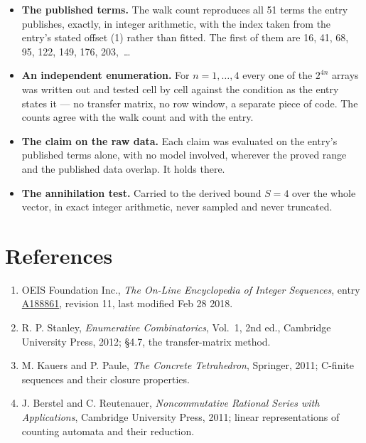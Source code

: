 \documentclass[11pt]{article}
\theoremstyle{definition}
\begin{document}
\begin{itemize}

\item {\bfseries The published terms.} The walk count reproduces all 51 terms the entry publishes, exactly, in integer arithmetic, with the index taken from the entry's stated offset (1) rather than fitted. The first of them are 16, 41, 68, 95, 122, 149, 176, 203,~\dots

\item {\bfseries An independent enumeration.} For $n = 1,\dots,4$ every one of the $2^{4n}$ arrays was written out and tested cell by cell against the condition as the entry states it --- no transfer matrix, no row window, a separate piece of code. The counts agree with the walk count and with the entry.

\item {\bfseries The claim on the raw data.} Each claim was evaluated on the entry's published terms alone, with no model involved, wherever the proved range and the published data overlap. It holds there.

\item {\bfseries The annihilation test.} Carried to the derived bound $S = 4$ over the whole vector, in exact integer arithmetic, never sampled and never truncated.

\end{itemize}

\section{References}

\begin{enumerate}

\item OEIS Foundation Inc., \emph{The On-Line Encyclopedia of Integer Sequences}, entry \href{https://oeis.org/A188861}{A188861}, revision 11, last modified Feb 28 2018.

\item R. P. Stanley, \emph{Enumerative Combinatorics}, Vol.~1, 2nd ed., Cambridge University Press, 2012; \S4.7, the transfer-matrix method.

\item M. Kauers and P. Paule, \emph{The Concrete Tetrahedron}, Springer, 2011; C-finite sequences and their closure properties.

\item J. Berstel and C. Reutenauer, \emph{Noncommutative Rational Series with Applications}, Cambridge University Press, 2011; linear representations of counting automata and their reduction.

\end{enumerate}
\end{document}
